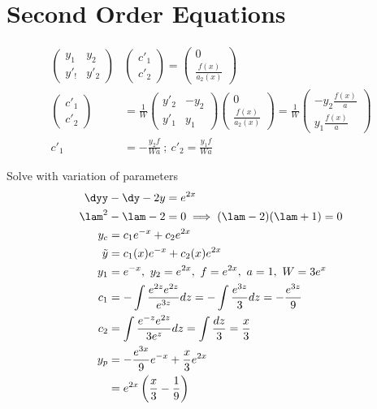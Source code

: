\documentclass[Maths.tex]{subfiles}
\begin{document}
\section{Second Order Equations}
\begin{align}
    \begin{pmatrix} y_1 & y_2 \\ y'_! & y'_2 \end{pmatrix} & \begin{pmatrix} c'_1 \\ c'_2 \end{pmatrix} = \begin{pmatrix} 0 \\ \frac{f(x)}{a_2(x)} \end{pmatrix} \\
    \begin{pmatrix} c'_1 \\ c'_2 \end{pmatrix} &= \frac{1}{W} \begin{pmatrix} y'_2 & -y_2 \\ y'_1 & y_1 \end{pmatrix} \begin{pmatrix} 0 \\ \frac{f(x)}{a_2(x)} \end{pmatrix} = \frac{1}{W}\begin{pmatrix} -y_2\frac{f(x)}{a} \\ y_1\frac{f(x)}{a} \end{pmatrix} \\
    c'_1 &= -\frac{y_2f}{Wa} ~;~ c'_2 = \frac{y_1f}{Wa}
\end{align}

\begin{example}
Solve with variation of parameters
\begin{align}
    \dyy &- \dy - 2y = e^{2x} \\
    \lam^2 &- \lam - 2 = 0 \implies (\lam-2)(\lam+1) = 0 \\
    y_c &= c_1e^{-x} + c_2e^{2x} \\
    \tilde{y} &= c_1(x)e^{-x} + c_2(x)e^{2x} \\
    y_1 &= e^{-x},~ y_2 = e^{2x},~ f = e^{2x},~ a = 1,~ W = 3e^x \\
    c_1 &= -\int \frac{e^{2z}e^{2z}}{e^{3z}}dz = -\int \frac{e^{3z}}{3}dz = -\frac{e^{3z}}{9} \\
    c_2 &= \int \frac{e^{-z}e^{2z}}{3e^z}dz = \int \frac{dz}{3} = \frac{x}{3} \\
    y_p &= -\frac{e^{3x}}{9}e^{-x} + \frac{x}{3}e^{2x} \\
    &= e^{2x}\left(\frac{x}{3} - \frac{1}{9}\right)
\end{align}
\end{example}
\end{document}
